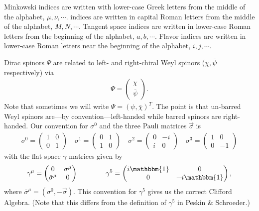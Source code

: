 \documentclass[12pt, oneside]{report}    %
\begin{document}
 Minkowski indices are written with lower-case Greek letters from the middle of the alphabet, $\mu, \nu, \cdots$.  indices are written in capital Roman letters from the middle of the alphabet, $M, N, \cdots$. Tangent space indices are written in lower-case Roman letters from the beginning of the alphabet, $a,b, \cdots$. Flavor indices are written in lower-case Roman letters near the beginning of the alphabet, $i,j,\cdots$.

Dirac spinors $\Psi$ are related to left- and right-chiral Weyl spinors ($\chi, \bar\psi$ respectively) via
\begin{align}
    \Psi = \begin{pmatrix}
        \chi \\
        \bar\psi
    \end{pmatrix}.
\end{align}
Note that sometimes we will write $\Psi=(\psi,\bar\chi)^T$. The point is that un-barred Weyl spinors are---by convention---left-handed while barred spinors are right-handed. 
Our convention for $\sigma^0$ and the three Pauli matrices $\vec\sigma$ is
\begin{align}
    \sigma^0 = 
    \begin{pmatrix}
        1 & 0\\
        0 & 1
    \end{pmatrix}
    \quad
    \sigma^1 = 
    \begin{pmatrix}
        0 & 1\\
        1 & 0
    \end{pmatrix}
    \quad
    \sigma^2 = 
    \begin{pmatrix}
        0 & -i\\
        i & 0
    \end{pmatrix}
    \quad
    \sigma^3 = 
    \begin{pmatrix}
        1 & 0\\
        0 & -1
    \end{pmatrix}
\end{align}
with the flat-space $\gamma$ matrices given by
\begin{align}
    \gamma^\mu =
    \begin{pmatrix}
        0 & \sigma^\mu \\
        \bar\sigma^\mu & 0 
    \end{pmatrix}
    \quad\quad\quad\quad
    \gamma^5=
    \begin{pmatrix}
        i\mathbbm{1} & 0 \\
        0 & -i\mathbbm{1}
    \end{pmatrix},
\end{align}
where $\bar\sigma^\mu = (\sigma^0, -\vec\sigma)$.
This convention for $\gamma^5$ gives us the correct Clifford Algebra. (Note that this differs from the definition of $\gamma^5$ in Peskin \& Schroeder.)




\printindex

% 
\end{document}
